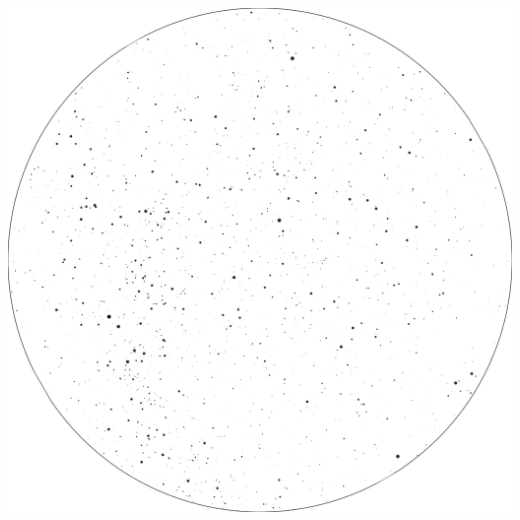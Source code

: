 \documentclass{./SAS-class-skygen}
\begin{document}
	\vspace{0.5cm}
    \begin{center}
    \includegraphics[width=\textwidth]{./pics/skychart48.png}
    \end{center}
    
    
\end{document}
